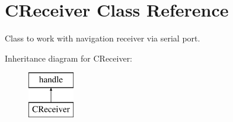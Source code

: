 \hypertarget{class_c_receiver}{\section{C\-Receiver Class Reference}
\label{class_c_receiver}
}


Class to work with navigation receiver via serial port.  


Inheritance diagram for C\-Receiver\-:\begin{figure}[H]
\begin{center}
\leavevmode
\includegraphics[height=2.000000cm]{class_c_receiver}
\end{center}
\end{figure}
